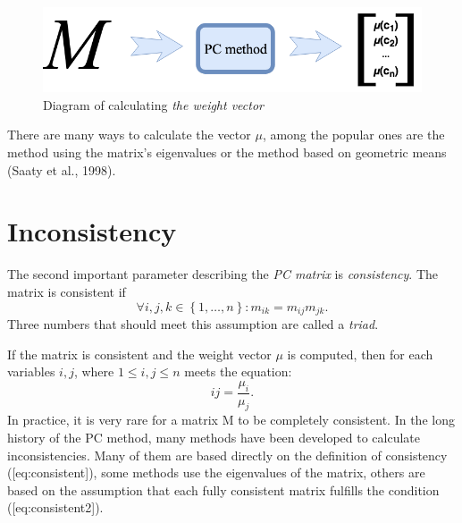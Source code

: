 \begin{figure}[ht]
\centerline{\includegraphics[scale=2.5]{fig1.png}}
\caption{Diagram of calculating \textit{the weight vector}}
\label{fig:fig1}
\end{figure}

There are many ways to calculate the vector $\mu$, among the popular ones are the method using the matrix's eigenvalues or the method based on geometric means (Saaty et al., 1998).

\section{Inconsistency}
\label{subsec:inconsistency}
The second important parameter describing the \textit{PC matrix} is \textit{consistency}. The matrix is consistent if 
	\begin{equation} 
		\forall i,j,k \in\left\{ 1,\ldots,n\right\} :m_{ik}=m_{ij}m_{jk}.
	\end{equation}
Three numbers that should meet this assumption are called a \textit{triad}.

If the matrix is consistent and the weight vector $\mu$ is computed, then for each variables $i,j$, where $1\leq i,j\leq n$ meets the equation: 
	\begin{equation} 
		{ij}=\frac{\mu_{i}}{\mu_{j}}.
 	\end{equation}
In practice, it is very rare for a matrix M to be completely consistent. In the long history of the PC method, many methods have been developed to calculate inconsistencies. Many of them are based directly on the definition of consistency ([eq:consistent]), some methods use the eigenvalues of the matrix, others are based on the assumption that each fully consistent matrix fulfills the condition ([eq:consistent2]).